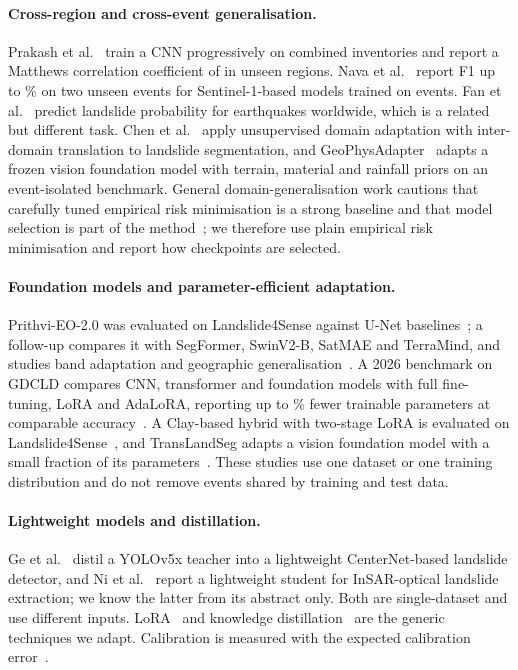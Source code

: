 \documentclass[11pt]{article}
\begin{document}
\paragraph{Cross-region and cross-event generalisation.} Prakash et al.~\cite{prakash2021} train a CNN progressively on combined inventories and report a Matthews correlation coefficient of \LitPrakashMcc{} in unseen regions. Nava et al.~\cite{nava2026sar} report F1 up to \LitNavaF\% on two unseen events for Sentinel-1-based models trained on \LitNavaEvents{} events. Fan et al.~\cite{fan2025nsr} predict landslide probability for earthquakes worldwide, which is a related but different task. Chen et al.~\cite{chen2024ludas} apply unsupervised domain adaptation with inter-domain translation to landslide segmentation, and GeoPhysAdapter~\cite{liu2026geophys} adapts a frozen vision foundation model with terrain, material and rainfall priors on an event-isolated benchmark. General domain-generalisation work cautions that carefully tuned empirical risk minimisation is a strong baseline and that model selection is part of the method~\cite{gulrajani2021domainbed}; we therefore use plain empirical risk minimisation and report how checkpoints are selected.

\paragraph{Foundation models and parameter-efficient adaptation.} Prithvi-EO-2.0 was evaluated on Landslide4Sense against U-Net baselines~\cite{szwarcman2024prithvi}; a follow-up compares it with SegFormer, SwinV2-B, SatMAE and TerraMind, and studies band adaptation and geographic generalisation~\cite{li2025prithvi}. A 2026 benchmark on GDCLD compares CNN, transformer and foundation models with full fine-tuning, LoRA and AdaLoRA, reporting up to \LitKowsherLora\% fewer trainable parameters at comparable accuracy~\cite{kowsher2026}. A Clay-based hybrid with two-stage LoRA is evaluated on Landslide4Sense~\cite{vu2026clay}, and TransLandSeg adapts a vision foundation model with a small fraction of its parameters~\cite{hou2024translandseg}. These studies use one dataset or one training distribution and do not remove events shared by training and test data.

\paragraph{Lightweight models and distillation.} Ge et al.~\cite{ge2023light} distil a YOLOv5x teacher into a lightweight CenterNet-based landslide detector, and Ni et al.~\cite{ni2026digsfnet} report a lightweight student for InSAR-optical landslide extraction; we know the latter from its abstract only. Both are single-dataset and use different inputs. LoRA~\cite{hu2022lora} and knowledge distillation~\cite{hinton2015distill} are the generic techniques we adapt. Calibration is measured with the expected calibration error~\cite{guo2017calib}.
\end{document}
